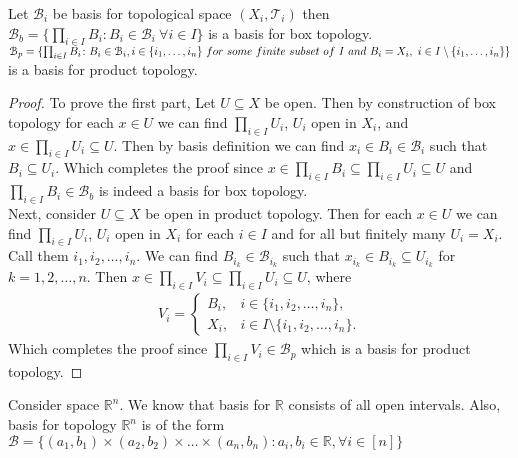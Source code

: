 \documentclass[a4paper,english,12pt]{article}   	%
\begin{document}
\begin{thm}
Let $\mathcal{B}_{i}$ be basis for topological space $(X_{i} , \mathcal{T}_{i})$ then $\mathcal{B}_{b} = \{\prod_{i \in I} B_{i} \colon B_{i} \in \mathcal{B}_{i} ~\forall i \in I\}$ is a basis for box topology.  $\mathcal{B}_{p} = \{\prod_{i \in I} B_{i} \colon B_{i} \in \mathcal{B}_{i}, i \in \{i_{1},\ldots,i_{n}\}  \\ ~for ~some ~finite ~subset ~of ~I ~and ~ B_{i} = X_{i}, ~ i \in I\setminus \{i_{1},\ldots,i_{n}\}  \}$ is a basis for product topology.
\end{thm}
\begin{proof}
To prove the first part, Let $U \subseteq X$ be open. Then by construction of box topology for each $x \in U$ we can find $\prod_{i \in I} U_{i}$, $U_{i}$ open in $X_{i}$, and $x \in \prod_{i \in I} U_{i} \subseteq U$. Then by basis definition we can find $x_{i} \in B_{i} \in \mathcal{B}_{i} $ such that $ B_{i} \subseteq U_{i}$. Which completes the proof since $x \in \prod_{i \in I} B_{i} \subseteq \prod_{i \in I} U_{i} \subseteq U$ and $\prod_{i \in I} B_{i} \in \mathcal{B}_{b}$ is indeed a basis for box topology.\\
 Next, consider  $U \subseteq X$ be open in product topology. Then for each $x \in U$ we can find $\prod_{i \in I} U_{i}$, $U_{i}$ open in $X_{i}$ for each $i \in I$ and for all but finitely many $U_{i} = X_{i}$. Call them $i_{1},i_{2},\ldots,i_{n}$. We can find $B_{i_{k}} \in \mathcal{B}_{i_{k}}$ such that $x_{i_{k}} \in B_{i_{k}} \subseteq U_{i_{k}}$ for $k = 1,2,\ldots,n$. Then $x \in \prod_{i \in I} V_{i} \subseteq \prod_{i \in I} U_{i} \subseteq U$, where 
 \begin{align*}
V_{i} = \begin{cases} B_{i}, &i \in \{ i_{1},i_{2},\ldots,i_{n}\}, \\ X_{i}, & i \in I \setminus \{ i_{1},i_{2},\ldots,i_{n}\}. \end{cases}
\end{align*}
Which completes the proof since $\prod_{i \in I} V_{i} \in \mathcal{B}_{p}$ which is a basis for product topology.
 \end{proof}
\begin{exmp}
Consider space $\mathbb{R}^{n}$.  We know that basis for $\mathbb{R}$ consists of all open intervals. Also, basis for topology $\mathbb{R}^{n}$ is of the form $\mathcal{B} = \{(a_{1} , b_{1}) \times (a_{2} , b_{2}) \times \ldots \times (a_{n} , b_{n}) \colon a_{i},b_{i} \in \mathbb{R}, \forall i \in [n]\}$
\end{exmp}
\end{document}
